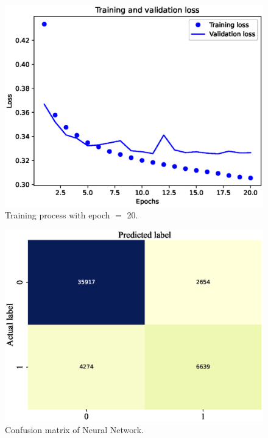 \documentclass[11pt, a4paper, jou]{apa7}
\begin{document}
\begin{figure}[h]
    \centering
    \caption{Training process with epoch $=$ 20. }\label{fig:NN_process_20}
    \includegraphics[width=.45\textwidth]{figures/error_20.eps}
\end{figure}

\begin{figure}[h]
    \centering
    \caption{Confusion matrix of Neural Network.}\label{fig:FC_confusion_matrix}
    \includegraphics[width=.45\textwidth]{figures/FC_confusion_matrix.eps}
\end{figure}

\begin{table}[h]
    \centering
    \caption{Classification results of Neural Network on the test set. }
    \label{tab:FC_summary}
\end{table}
\end{document}
